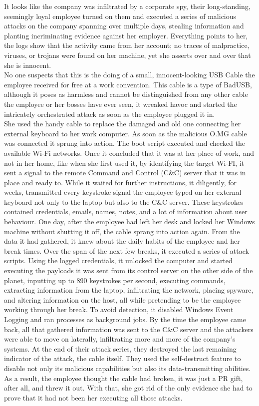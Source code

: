 It looks like the company was infiltrated by a corporate spy, their long-standing, seemingly loyal employee turned on them and executed a series of malicious attacks on the company spanning over multiple days, stealing information and planting incriminating evidence against her employer. Everything points to her, the logs show that the activity came from her account; no traces of malpractice, viruses, or trojans were found on her machine, yet she asserts over and over that she is innocent. \\
No one suspects that this is the doing of a small, innocent-looking USB Cable the employee received for free at a work convention. This cable is a type of BadUSB, although it poses as harmless and cannot be distinguished from any other cable the employee or her bosses have ever seen, it wreaked havoc and started the intricately orchestrated attack as soon as the employee plugged it in. \\
She used the handy cable to replace the damaged and old one connecting her external keyboard to her work computer. As soon as the malicious O.MG cable was connected it sprung into action. The boot script executed and checked the available Wi-Fi networks. Once it concluded that it was at her place of work, and not in her home, like when she first used it, by identifying the target Wi-FI, it sent a signal to the remote Command and Control (C\&C) server that it was in place and ready to. While it waited for further instructions, it diligently, for weeks, transmitted every keystroke signal the employee typed on her external keyboard not only to the laptop but also to the C\&C server. These keystrokes contained credentials, emails, names, notes, and a lot of information about user behaviour. One day, after the employee had left her desk and locked her Windows machine without shutting it off, the cable sprang into action again. From the data it had gathered, it knew about the daily habits of the employee and her break times. Over the span of the next few breaks, it executed a series of attack scripts. Using the logged credentials, it unlocked the computer and started executing the payloads it was sent from its control server on the other side of the planet, inputting up to 890 keystrokes per second, executing commands, extracting information from the laptop, infiltrating the network, placing spyware, and altering information on the host, all while pretending to be the employee working through her break. To avoid detection, it disabled Windows Event Logging and ran processes as background jobs. By the time the employee came back, all that gathered information was sent to the C\&C server and the attackers were able to move on laterally, infiltrating more and more of the company's systems. At the end of their attack series, they destroyed the last remaining indicator of the attack, the cable itself. They used the self-destruct feature to disable not only its malicious capabilities but also its data-transmitting abilities. As a result, the employee thought the cable had broken, it was just a PR gift, after all, and threw it out. With that, she got rid of the only evidence she had to prove that it had not been her executing all those attacks.\\
